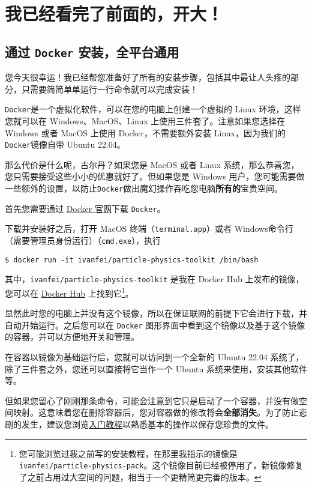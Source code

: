 \documentclass[a4paper]{ctexart}
\begin{document}
\section{我已经看完了前面的，开大！}
\subsection{通过 \texttt{Docker} 安装，全平台通用 \label{docker}}

您今天很幸运！我已经帮您准备好了所有的安装步骤，包括其中最让人头疼的部分，只需要简简单单运行一行命令就可以完成安装！

\texttt{Docker}是一个虚拟化软件，可以在您的电脑上创建一个虚拟的 Linux 环境，这样您就可以在 Windows、MacOS、Linux 上使用三件套了。注意如果您选择在 Windows 或者 MacOS 上使用 Docker，不需要额外安装 Linux，因为我们的\texttt{Docker}镜像自带 Ubuntu 22.04。

那么代价是什么呢，古尔丹？如果您是 MacOS 或者 Linux 系统，那么恭喜您，您只需要接受这些小小的优惠就好了。但如果您是 Windows 用户，您可能需要做一些额外的设置，以防止\texttt{Docker}做出魔幻操作吞吃您电脑\textbf{所有的}宝贵空间。

首先您需要通过 \href{https://www.docker.com/}{Docker 官网}下载 \texttt{Docker}。

下载并安装好之后，打开 MacOS 终端（\texttt{terminal.app}）或者 Windows命令行（需要管理员身份运行）（\texttt{cmd.exe}），执行
\begin{verbatim}
$ docker run -it ivanfei/particle-physics-toolkit /bin/bash
\end{verbatim}
其中，\texttt{ivanfei/particle-physics-toolkit} 是我在 Docker Hub 上发布的镜像，您可以在 \href{https://hub.docker.com/r/ivanfei/particle-physics-toolkit}{Docker Hub} 上找到它\footnote{您可能浏览过我之前写的安装教程，在那里我指示的镜像是 \texttt{ivanfei/particle-physics-pack}。这个镜像目前已经被停用了，新镜像修复了之前占用过大空间的问题，相当于一个更精简更完善的版本。}。

显然此时您的电脑上并没有这个镜像，所以在保证联网的前提下它会进行下载，并自动开始运行。之后您可以在 \texttt{Docker} 图形界面中看到这个镜像以及基于这个镜像的容器，并可以方便地开关和管理。

在容器以镜像为基础运行后，您就可以访问到一个全新的 Ubuntu 22.04 系统了，除了三件套之外，您还可以直接将它当作一个 Ubuntu 系统来使用，安装其他软件等。

但如果您留心了刚刚那条命令，可能会注意到它只是启动了一个容器，并没有做空间映射。这意味着您在删除容器后，您对容器做的修改将会\textbf{全部消失}。为了防止悲剧的发生，建议您浏览\href{https://github.com/mylxsw/growing-up/blob/master/doc/Docker简明教程.md}{入门教程}以熟悉基本的操作以保存您珍贵的文件。
\end{document}
